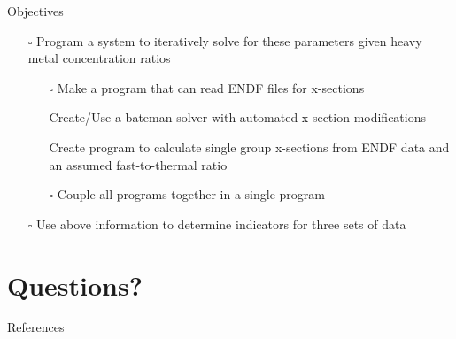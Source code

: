 \documentclass{beamer}
\newcommand{\cmark}{\ding{51}}%
\newcommand{\done}{\rlap{$\square$}{\raisebox{2pt}{\large\hspace{1pt}\cmark}}%
  \hspace{-2.5pt}}
\newcommand{\notdone}{$\square$}
\begin{document}
\begin{frame}[allowframebreaks]{Objectives}
\begin{itemize}
{  respect to one of the isotopes determined above}
  \begin{itemize}
  \item[\tiny\done]{\tiny Burnup}
  \item[\tiny\done]{\tiny Fluence Rate}
  \item[\tiny\done]{\tiny Initial Enrichment}
  \item[\tiny\done]{\tiny Decay Time}
  \item[\tiny\notdone]{\tiny Fast-to-thermal ratios (requires iteration)}
  \end{itemize}
\item[\notdone]{\small Program a system to iteratively solve for these parameters
  given heavy metal concentration
  ratios}
  \begin{itemize}
  \item[\tiny\notdone]{\tiny Make a program that can read ENDF files for x-sections}
  \item[\tiny\done]{\tiny Create/Use a bateman solver with automated x-section modifications}
  \item[\tiny\done]{\tiny Create program to calculate single group x-sections from
    ENDF data and an assumed
    fast-to-thermal ratio}
  \item[\tiny\notdone]{\tiny Couple all programs together in a single program} 
  \end{itemize}
\item[\notdone]{\small Use above information to determine indicators for three sets of data}
\end{itemize}
\end{frame}




\appendix
\section{Questions?}
\begin{frame}
\sectionpage
\end{frame}


\begin{frame}[allowframebreaks]{References}
\def\newblock{}
\nocite{*}
\scriptsize{}

\end{frame}
\end{document}
